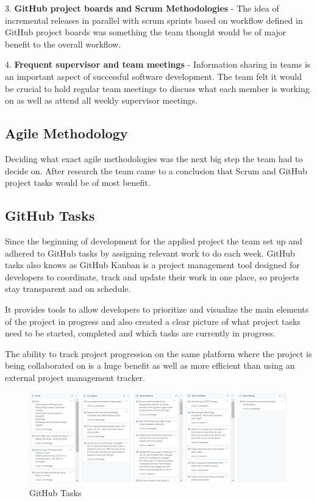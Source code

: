 3. \textbf{GitHub project boards and Scrum Methodologies} - The idea of incremental releases in parallel with scrum sprints based on workflow defined in GitHub project boards was something the team thought would be of major benefit to the overall workflow.

4. \textbf{Frequent supervisor and team meetings} - Information sharing in teams is an important aspect of successful software development. The team felt it would be crucial to hold regular team meetings to discuss what each member is working on as well as attend all weekly supervisor meetings.

\subsection{Agile Methodology}
Deciding what exact agile methodologies was the next big step the team had to decide on. After research the team came to a conclusion that Scrum and GitHub project tasks would be of most benefit.


\subsection{GitHub Tasks}
Since the beginning of development for the applied project the team set up and adhered to GitHub tasks by assigning relevant work to do each week. GitHub tasks also knows as GitHub Kanban is a project management tool designed for developers to coordinate, track and update their work in one place, so projects stay transparent and on schedule.

\vspace{5mm} %


It provides tools to allow developers to prioritize and visualize the main elements of the project in progress and also created a clear picture of what project tasks need to be started, completed and which tasks are currently in progress.\cite{GitHubtasks}

\vspace{5mm} %

The ability to track project progression on the same platform where the project is being collaborated on is a huge benefit as well as more efficient than using an external project management tracker. 

\vspace{5mm} %


\begin{figure}[ht]
    \centering
    \includegraphics[scale=0.50]{img/GitHubToDo.PNG}
    \caption{GitHub Tasks}
    \label{fig:my_label1}
\end{figure}


